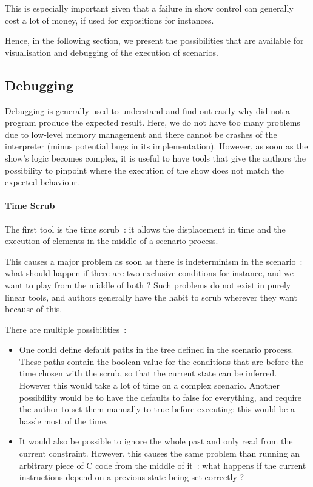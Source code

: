 \documentclass{sigchi}
\begin{document}
This is especially important given that a failure in show control can generally cost a lot of money, if used for expositions for instances.

Hence, in the following section, we present the possibilities that are available for visualisation and debugging of the execution of scenarios.

\subsection{Debugging}
Debugging is generally used to understand and find out easily why did not a program produce the expected result. Here, we do not have too many problems due to low-level memory management and there cannot be crashes of the interpreter (minus potential bugs in its implementation).  However, as soon as the show's logic becomes complex, it is useful to have tools that give the authors the possibility to pinpoint where the execution of the show does not match the expected behaviour.

\paragraph{Time Scrub}
The first tool is the time scrub~: it allows the displacement in time and the execution of elements in the middle of a scenario process. 

This causes a major problem as soon as there is indeterminism in the scenario~: what should happen if there are two exclusive conditions for instance, and we want to play from the middle of both ? Such problems do not exist in purely linear tools, and authors generally have the habit to scrub wherever they want because of this.

There are multiple possibilities~: 

\begin{itemize}
    \item One could define default paths in the tree defined in the scenario process. These paths contain the boolean value for the conditions that are before the time chosen with the scrub, so that the current state can be inferred. However this would take a lot of time on a complex scenario.
    Another possibility would be to have the defaults to false for everything, and require the author to set them manually to true before executing; this would be a hassle most of the time.
    \item It would also be possible to ignore the whole past and only read from the current constraint. However, this causes the same problem than running an arbitrary piece of C code from the middle of it~: what happens if the current instructions depend on a previous state being set correctly ?
\end{itemize}
\end{document}
